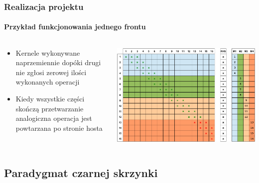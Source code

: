 \documentclass[12pt,handout]{beamer}
\begin{document}
\begin{frame}
\frametitle{Realizacja projektu}
\framesubtitle{Przykład funkcjonowania jednego frontu}
\begin{columns}[t] %
     \begin{column}[T]{5cm} %
     \begin{itemize}
		\item Kernele wykonywane naprzemiennie dopóki drugi nie zgłosi zerowej ilości wykonanych operacji
		\item Kiedy wszystkie części skończą przetwarzanie analogiczna operacja jest powtarzana po stronie hosta
     \end{itemize}
     \end{column}
     \begin{column}[T]{7cm} %
		\includegraphics[scale=0.3]{frame9.jpg}
     \end{column}
     \end{columns}
\end{frame}

\subsection{Paradygmat czarnej skrzynki}
\end{document}
